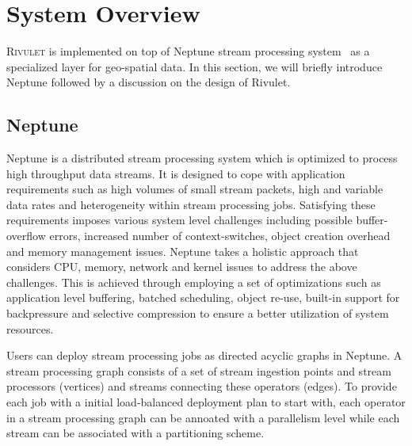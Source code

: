 \section{System Overview}
\label{sec:system}
\textsc{Rivulet} is implemented on top of Neptune stream processing system~\cite{buddhika2016neptune} as a specialized layer for geo-spatial data.
In this section, we will briefly introduce Neptune followed by a discussion on the design of Rivulet.

\subsection{Neptune}
Neptune is a distributed stream processing system which is optimized to process high throughput data streams.
It is designed to cope with application requirements such as high volumes of small stream packets, high and variable data rates and heterogeneity within stream processing jobs.
Satisfying these requirements imposes various system level challenges including possible buffer-overflow errors, increased number of context-switches, object creation overhead and memory management issues.
Neptune takes a holistic approach that considers CPU, memory, network and kernel issues to address the above challenges.
This is achieved through employing a set of optimizations such as application level buffering, batched scheduling, object re-use, built-in support for backpressure and selective compression to ensure a better utilization of system resources.

Users can deploy stream processing jobs as directed acyclic graphs in Neptune.
A stream processing graph consists of a set of stream ingestion points and stream processors (vertices) and streams connecting these operators (edges).
To provide each job with a initial load-balanced deployment plan to start with, each operator in a stream processing graph can be annoated with a parallelism level while each stream can be associated with a partitioning scheme.

